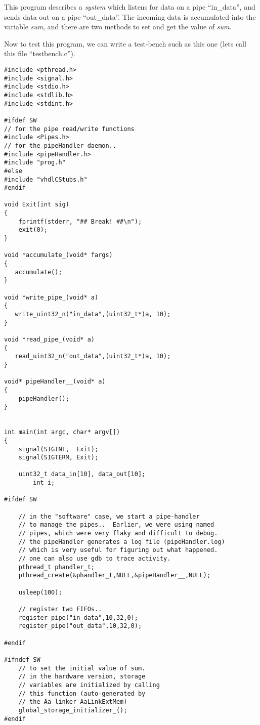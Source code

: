 \documentclass{article}
\begin{document}
This program describes a {\em system} which listens
for data on a pipe ``in\_data'', and sends data
out on a pipe ``out\_data''.  The incoming data
is accumulated into the variable {\em sum}, and
there are two methods to set and get the value
of {\em sum}.

Now to test this program, we can write a test-bench
such as this one (lets call this file ``testbench.c'').
\begin{verbatim}
#include <pthread.h>
#include <signal.h>
#include <stdio.h>
#include <stdlib.h>
#include <stdint.h>

#ifdef SW
// for the pipe read/write functions
#include <Pipes.h>
// for the pipeHandler daemon..
#include <pipeHandler.h>
#include "prog.h"
#else
#include "vhdlCStubs.h"
#endif

void Exit(int sig)
{
	fprintf(stderr, "## Break! ##\n");
	exit(0);
}

void *accumulate_(void* fargs)
{
   accumulate();
}

void *write_pipe_(void* a)
{
   write_uint32_n("in_data",(uint32_t*)a, 10);
}

void *read_pipe_(void* a)
{
   read_uint32_n("out_data",(uint32_t*)a, 10);
}

void* pipeHandler__(void* a)
{
	pipeHandler();
}


int main(int argc, char* argv[])
{
	signal(SIGINT,  Exit);
  	signal(SIGTERM, Exit);

	uint32_t data_in[10], data_out[10];
        int i;

#ifdef SW

	// in the "software" case, we start a pipe-handler
	// to manage the pipes..  Earlier, we were using named
	// pipes, which were very flaky and difficult to debug.
	// the pipeHandler generates a log file (pipeHandler.log)
	// which is very useful for figuring out what happened.
	// one can also use gdb to trace activity.
	pthread_t phandler_t;
	pthread_create(&phandler_t,NULL,&pipeHandler__,NULL);

	usleep(100);
	
	// register two FIFOs..
	register_pipe("in_data",10,32,0);
	register_pipe("out_data",10,32,0);

#endif
	
#ifndef SW
	// to set the initial value of sum.
	// in the hardware version, storage
	// variables are initialized by calling
	// this function (auto-generated by
	// the Aa linker AaLinkExtMem)
	global_storage_initializer_();
#endif




\end{verbatim}
\end{document}
